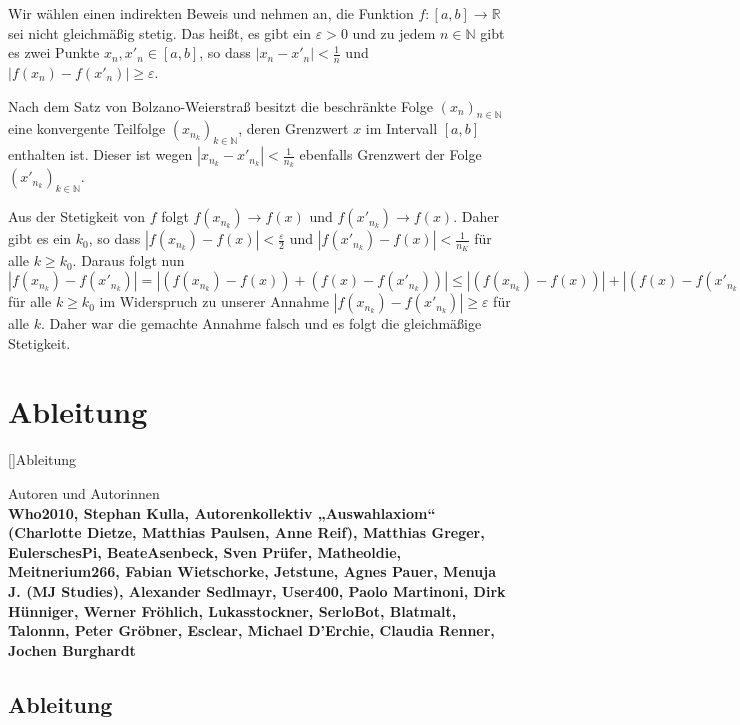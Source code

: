 \documentclass[fontsize=9pt,
               parskip=half-,
               DIV=14,
               listof=chapterentry,
               tocflat]{scrbook}
\newenvironment{authors}{\par\vspace*{\fill}\color{white}Autoren und
Autorinnen\\\bfseries}{\clearpage}
\begin{document}
\begin{proof*}
Wir wählen einen indirekten Beweis und nehmen an, die Funktion $f:[a,b]\to \mathbb {R} $ sei nicht gleichmäßig stetig. Das heißt, es gibt ein $\varepsilon >0$ und zu jedem $n\in \mathbb {N} $ gibt es zwei Punkte $x_{n},x'_{n}\in [a,b]$, so dass $|x_{n}-x'_{n}|<{\tfrac {1}{n}}$ und $|f(x_{n})-f(x'_{n})|\geq \varepsilon $.

Nach dem Satz von Bolzano-Weierstraß besitzt die beschränkte Folge $(x_{n})_{n\in \mathbb {N} }$ eine konvergente Teilfolge $(x_{n_{k}})_{k\in \mathbb {N} }$, deren Grenzwert $x$ im Intervall $[a,b]$ enthalten ist. Dieser ist wegen $|x_{n_{k}}-x'_{n_{k}}|<{\tfrac {1}{n_{k}}}$ ebenfalls Grenzwert der Folge $(x'_{n_{k}})_{k\in \mathbb {N} }$.

Aus der Stetigkeit von $f$ folgt $f(x_{n_{k}})\to f(x)$ und $f(x'_{n_{k}})\to f(x)$. Daher gibt es ein $k_{0}$, so dass $|f(x_{n_{k}})-f(x)|<{\tfrac {\varepsilon }{2}}$ und $|f(x'_{n_{k}})-f(x)|<{\tfrac {1}{n_{K}}}$ für alle $k\geq k_{0}$. Daraus folgt nun $|f(x_{n_{k}})-f(x'_{n_{k}})|=|(f(x_{n_{k}})-f(x))+(f(x)-f(x'_{n_{k}}))|\leq |(f(x_{n_{k}})-f(x))|+|(f(x)-f(x'_{n_{k}}))|<{\tfrac {\varepsilon }{2}}+{\tfrac {\varepsilon }{2}}=\varepsilon $ für alle $k\geq k_{0}$ im Widerspruch zu unserer Annahme $|f(x_{n_{k}})-f(x'_{n_{k}})|\geq \varepsilon $ für alle $k$. Daher war die gemachte Annahme falsch und es folgt die gleichmäßige Stetigkeit.

\end{proof*}

\part{Ableitung}

[]{Ableitung}\begin{authors}
Who2010, Stephan Kulla, Autorenkollektiv „Auswahlaxiom“ (Charlotte Dietze, Matthias Paulsen, Anne Reif), Matthias Greger, EulerschesPi, BeateAsenbeck, Sven Prüfer, Matheoldie, Meitnerium266, Fabian Wietschorke, Jetstune, Agnes Pauer, Menuja J. (MJ Studies), Alexander Sedlmayr, User400, Paolo Martinoni, Dirk Hünniger, Werner Fröhlich, Lukasstockner, SerloBot, Blatmalt, Talonnn, Peter Gröbner, Esclear, Michael D'Erchie, Claudia Renner, Jochen Burghardt\end{authors}

\chapter{Ableitung}
\end{document}
